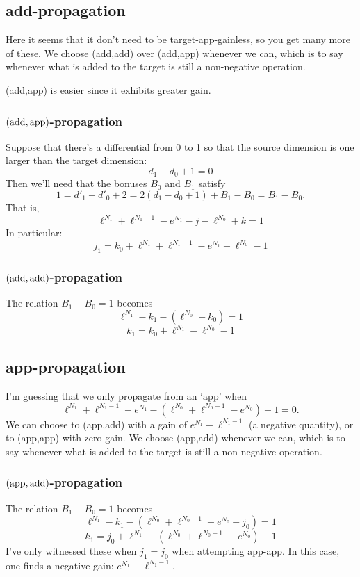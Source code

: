 \documentclass[10pt]{article}
\begin{document}
\begin{conjectured differentials}
\subsection{add-propagation}
Here it seems that it don't need to be target-app-gainless, so you get many more of these. We choose (add,add) over (add,app) whenever we can, which is to say whenever what is added to the target is still a non-negative operation.

(add,app) is easier since it exhibits greater gain.

\subsubsection{$(\textup{add},\textup{app})$-propagation}
Suppose that there's a differential from 0 to 1 so that the source dimension is one larger than the target dimension:
\[d_1-d_0+1=0\]
Then we'll need that the bonuses $B_0$ and $B_1$ satisfy
\[1=d'_1-d'_0+2=2(d_1-d_0+1)+B_1-B_0=B_1-B_0.\]
That is,
\[\ell^{N_1}+\ell^{N_1-1}-{e}^{N_1}-j-\ell^{N_0}+k=1\]
In particular:
\[j_1=k_0+\ell^{N_1}+\ell^{N_1-1}-{e}^{N_1}-\ell^{N_0}-1\]

\subsubsection{$(\textup{add},\textup{add})$-propagation}
The relation $B_1-B_0=1$ becomes
\[\ell^{N_1}-k_1-(\ell^{N_0}-k_0)=1\]
\[k_1=k_0+\ell^{N_1}-\ell^{N_0}-1\]

\subsection{app-propagation}
I'm guessing that we only propagate from an `app' when
\[\ell^{N_1}+\ell^{N_1-1}-{e}^{N_1}-(\ell^{N_0}+\ell^{N_0-1}-{e}^{N_0})-1=0.\]
We can choose to (app,add) with a gain of $e^{N_1}-\ell^{N_1-1}$ (a negative quantity), or to (app,app) with zero gain. We choose (app,add) whenever we can, which is to say whenever what is added to the target is still a non-negative operation.

\subsubsection{$(\textup{app},\textup{add})$-propagation}
The relation $B_1-B_0=1$ becomes
\[\ell^{N_1}-k_1-(\ell^{N_0}+\ell^{N_0-1}-{e}^{N_0}-j_0)=1\]
\[k_1=j_0+\ell^{N_1}-(\ell^{N_0}+\ell^{N_0-1}-{e}^{N_0})-1\]
I've only witnessed these when $j_1=j_0$ when attempting app-app. In this case, one finds a negative gain: $e^{N_1}-\ell^{N_1-1}$.

\end{conjectured differentials}
\end{document}
